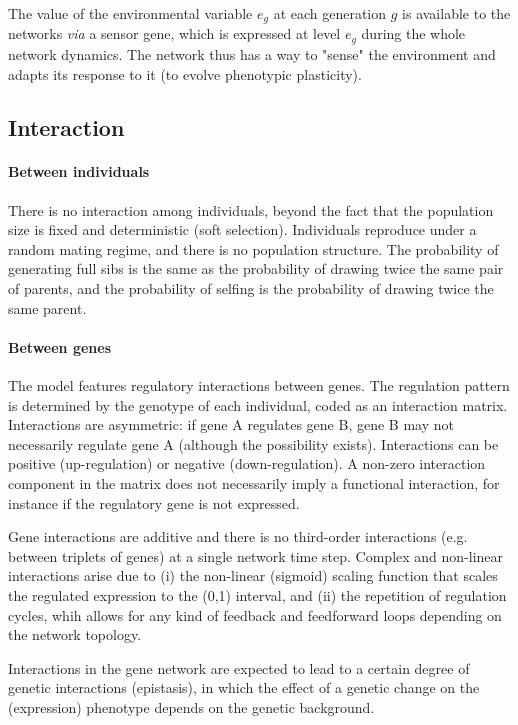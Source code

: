 \documentclass{article}
\begin{document}
The value of the environmental variable $e_g$ at each generation $g$ is available to the networks \emph{via} a sensor gene, which is expressed at level $e_g$ during the whole network dynamics. The network thus has a way to "sense" the environment and adapts its response to it (to evolve phenotypic plasticity). 

\subsection{Interaction}

\paragraph{Between individuals} There is no interaction among individuals, beyond the fact that the population size is fixed and deterministic (soft selection). Individuals reproduce under a random mating regime, and there is no population structure. The probability of generating full sibs is the same as the probability of drawing twice the same pair of parents, and the probability of selfing is the probability of drawing twice the same parent. 

\paragraph{Between genes} The model features regulatory interactions between genes. The regulation pattern is determined by the genotype of each individual, coded as an interaction matrix. Interactions are asymmetric: if gene A regulates gene B, gene B may not necessarily regulate gene A (although the possibility exists). Interactions can be positive (up-regulation) or negative (down-regulation). A non-zero interaction component in the matrix does not necessarily imply a functional interaction, for instance if the regulatory gene is not expressed. 

Gene interactions are additive and there is no third-order interactions (e.g. between triplets of genes) at a single network time step. Complex and non-linear interactions arise due to (i) the non-linear (sigmoid) scaling function that scales the regulated expression to the (0,1) interval, and (ii) the repetition of regulation cycles, whih allows for any kind of feedback and feedforward loops depending on the network topology. 

Interactions in the gene network are expected to lead to a certain degree of genetic interactions (epistasis), in which the effect of a genetic change on the (expression) phenotype depends on the genetic background.
\end{document}
